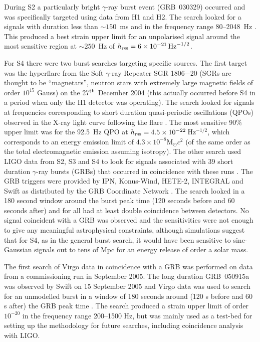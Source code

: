 \documentclass{article}
\begin{document}
During S2 a particularly bright $\gamma$-ray burst event (GRB~030329) occurred 
and was specifically targeted using data from H1 and H2. The search looked for a 
signals with duration less than $\sim 150$~ms and in the frequency range 80--2048~Hz
\cite{Abbott:2005d}. This produced a best strain upper limit for an unpolarised
signal around the most sensitive region at  $\sim250$~Hz of $h_{\rm
rss}=6\times10^{-21}\,{\rm Hz}^{-1/2}$.

For S4 there were two burst searches targeting specific sources. The first target was
the hyperflare from the Soft $\gamma$-ray Repeater SGR 1806$-$20 (SGRs are
thought to be ``magnetars'', neutron stars with extremely large magnetic fields
of order $10^{15}$ Gauss) on the 27$^{\rm th}$ December 2004 \cite{Hurley:2005}
(this actually occurred before S4 in a period when only the H1 detector was
operating). The search looked for signals at frequencies corresponding to short
duration quasi-periodic oscillations (QPOs) observed in the X-ray light curve
following the flare \cite{Abbott:2007c}. The most sensitive 90\% upper limit was
for the 92.5~Hz QPO at $h_{\rm rss} = 4.5\times10^{-22}$\,Hz$^{-1/2}$, which
corresponds to an energy emission limit of $4.3\times10^{-8}$M$_{\odot}c^2$ (of
the same order as the total electromagnetic emission assuming isotropy). The
other search used LIGO data from S2, S3 and S4 to look for signals associated
with 39 short duration $\gamma$-ray bursts (GRBs) that occurred in coincidence
with these runs \cite{Abbott:2008c}. The GRB triggers were provided by IPN,
Konus-Wind, HETE-2, INTEGRAL and Swift as distributed by the GRB Coordinate
Network \cite{GCN}. The search looked in a 180 second window around the burst
peak time (120 seconds before and 60 seconds after) and for all had at least
double coincidence between detectors. No signal coincident with a GRB was
observed and the sensitivities were not enough to give any meaningful
astrophysical constraints, although simulations suggest that for S4, as in the general burst search,
it would have been sensitive to sine-Gaussian signals out to tens of Mpc for an
energy release of order a solar mass.

The first search of Virgo data in coincidence with a GRB was performed on data
from a commissioning run in September 2005. The long duration GRB~050915a was observed
by Swift on 15 September 2005 and Virgo data was used to search for an 
unmodelled burst in a window of 180 seconds around (120 s before and 60 s after)
the GRB peak time \cite{Acernese:2008a}. The search produced a strain upper
limit of order $10^{-20}$ in the frequency range 200--1500 Hz, but was mainly
used as a test-bed for setting up the methodology for future searches, including
coincidence analysis with LIGO.
\end{document}
